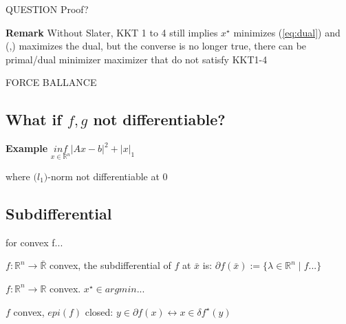 QUESTION Proof?

\textbf{Remark} Without Slater,
KKT 1 to 4 still implies $x^\star$ minimizes (\ref{eq:dual})
and (\lambda,\nu) maximizes the dual,
but the converse is no longer true,
there can be primal/dual minimizer maximizer that do not satisfy KKT1-4

FORCE BALLANCE %

\subsection{What if $f, g$ not differentiable?}

\textbf{Example} $\underset{x \in \mathcal{\mathbb{R}}^n}{inf}|Ax -b|^2 + |x|_1$

where $\mathcal(l_1)$-norm not  differentiable at 0

\subsection{Subdifferential}

for  convex  f... %

\begin{definition}
	$f: \mathbb{R}^{n} \rightarrow \bar{\mathbb{R}}$ convex,
	the subdifferential of $f$ at $\bar{x}$ is:
	$\partial f(\bar{x}):= \{\lambda \in \mathbb{R}^{n} \mid f... \}$ %
\end{definition}

\begin{proposition}[]
	$f: \mathbb{R}^{n} \rightarrow \mathbb{R}$ convex.
	$x^\star \in argmin...$
\end{proposition}

\begin{proposition}
	$f$ convex, $epi(f)$ closed:
	$y \in \partial f(x) \leftrightarrow x \in \delta f^\star(y)$
\end{proposition}



